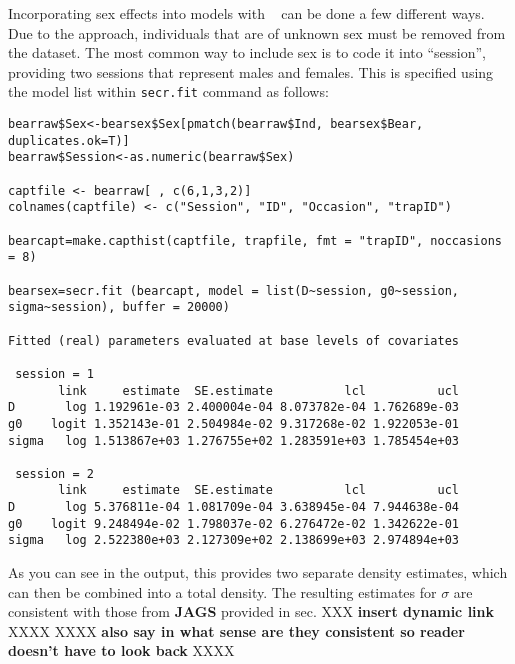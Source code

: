 Incorporating sex effects into models with \secr~ can be done a few
different ways.  Due to the approach, individuals that
are of unknown sex must be removed from the dataset.
The most common way to include
sex is to code it into ``session'', providing two sessions that
represent males and females.  This is specified using the model list
within \mbox{\tt secr.fit} command as follows:
{\small
\begin{verbatim}
bearraw$Sex<-bearsex$Sex[pmatch(bearraw$Ind, bearsex$Bear, duplicates.ok=T)]
bearraw$Session<-as.numeric(bearraw$Sex)

captfile <- bearraw[ , c(6,1,3,2)]
colnames(captfile) <- c("Session", "ID", "Occasion", "trapID")

bearcapt=make.capthist(captfile, trapfile, fmt = "trapID", noccasions = 8)

bearsex=secr.fit (bearcapt, model = list(D~session, g0~session, sigma~session), buffer = 20000)

Fitted (real) parameters evaluated at base levels of covariates

 session = 1
       link     estimate  SE.estimate          lcl          ucl
D       log 1.192961e-03 2.400004e-04 8.073782e-04 1.762689e-03
g0    logit 1.352143e-01 2.504984e-02 9.317268e-02 1.922053e-01
sigma   log 1.513867e+03 1.276755e+02 1.283591e+03 1.785454e+03

 session = 2
       link     estimate  SE.estimate          lcl          ucl
D       log 5.376811e-04 1.081709e-04 3.638945e-04 7.944638e-04
g0    logit 9.248494e-02 1.798037e-02 6.276472e-02 1.342622e-01
sigma   log 2.522380e+03 2.127309e+02 2.138699e+03 2.974894e+03
\end{verbatim}
}

\begin{comment}
but none XXX {\bf recommend moving this ``but none....''
end of sentence to a general discussion point at the end of this
section} XXXXX
of these allow us to include partial observability.
{\bf not sure what is meant by ``which is different'' clarify
this sentence here and probably this should be moved to the end of the
section as a general discussion point} XXXXXX
from the \textbf{WinBUGS} approach.
\end{comment}

As you can see in the output, this provides two separate density
estimates, which can then be combined into a total density.  The
resulting estimates for $\sigma$ are consistent with those from {\bf JAGS}
provided in sec. XXX {\bf insert dynamic link} XXXX XXXX {\bf also say in what
sense are they consistent so reader doesn't have to look back} XXXX

